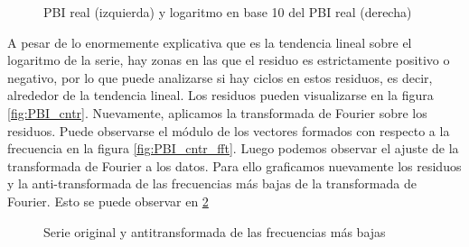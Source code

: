 \documentclass[a4paper]{article}
\begin{document}
\begin{figure}[H]
	\centering
	\caption{PBI real (izquierda) y logaritmo en base 10 del PBI real (derecha)} 	
	\label{fig:PBI_orig}
\end{figure}

A pesar de lo enormemente explicativa que es la tendencia lineal sobre el logaritmo de la serie, hay zonas en las que el residuo es estrictamente positivo o negativo, por lo que puede analizarse si hay ciclos en estos residuos, es decir, alrededor de la tendencia lineal. Los residuos pueden visualizarse en la figura \ref{fig:PBI_cntr}. Nuevamente, aplicamos la transformada de Fourier sobre los residuos. Puede observarse el módulo de los vectores formados con respecto a la frecuencia en la figura \ref{fig:PBI_cntr_fft}. Luego podemos observar el ajuste de la transformada de Fourier a los datos. Para ello graficamos nuevamente los residuos y la anti-transformada de las frecuencias más bajas de la transformada de Fourier. Esto se puede observar en \ref{fig:PBI_cntr_antifft}

\begin{figure}[H]
	\centering
	\caption{Serie original y antitransformada de las frecuencias más bajas} 
	\label{fig:PBI_cntr_antifft}
\end{figure}
\end{document}
